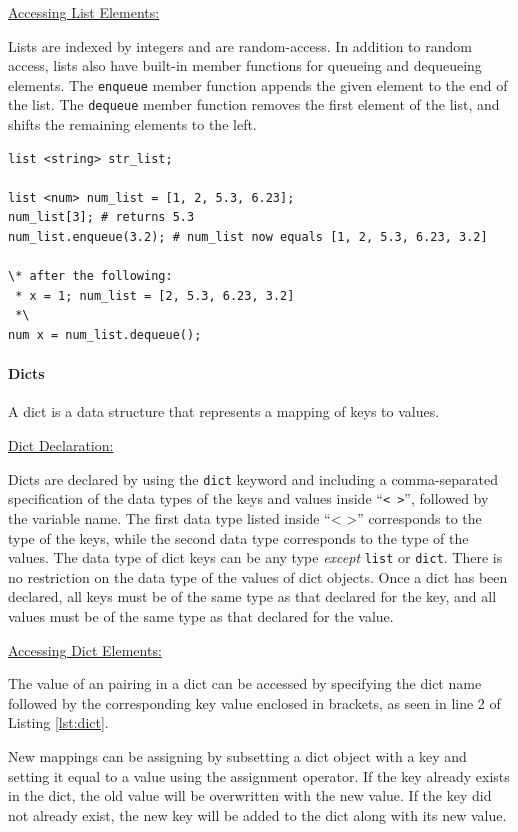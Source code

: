 \documentclass{article}
\newcommand{\code}[1]{\texttt{#1}} %
\begin{document}
\underline{Accessing List Elements:}

Lists are indexed by integers and are random-access. In addition to random access, lists also have built-in member functions for queueing and dequeueing elements. The \code{enqueue} member function appends the given element to the end of the list. The \code{dequeue} member function removes the first element of the list, and shifts the remaining elements to the left. 

\begin{lstlisting}[language=pltLang, caption=The ``list'' type., label=lst:list]
list <string> str_list;

list <num> num_list = [1, 2, 5.3, 6.23];
num_list[3]; # returns 5.3
num_list.enqueue(3.2); # num_list now equals [1, 2, 5.3, 6.23, 3.2]

\* after the following:
 * x = 1; num_list = [2, 5.3, 6.23, 3.2]
 *\
num x = num_list.dequeue();
\end{lstlisting}

\paragraph{Dicts}

A dict is a data structure that represents a mapping of keys to values. 

\underline{Dict Declaration:}

Dicts are declared by using the \code{dict} keyword and including a comma-separated specification of the data types of the keys and values inside ``\code{< >}'', followed by the variable name. The first data type listed inside ``< >'' corresponds to the type of the keys, while the second data type corresponds to the type of the values. The data type of dict keys can be any type \emph{except} \code{list} or \code{dict}. There is no restriction on the data type of the values of dict objects. Once a dict has been declared, all keys must be of the same type as that declared for the key, and all values must be of the same type as that declared for the value. 

\underline{Accessing Dict Elements:}

The value of an pairing in a dict can be accessed by specifying the dict name followed by the corresponding key value enclosed in brackets, as seen in line 2 of Listing \ref{lst:dict}.

New mappings can be assigning by subsetting a dict object with a key and setting it equal to a value using the assignment operator. If the key already exists in the dict, the old value will be overwritten with the new value. If the key did not already exist, the new key will be added to the dict along with its new value.
\end{document}

